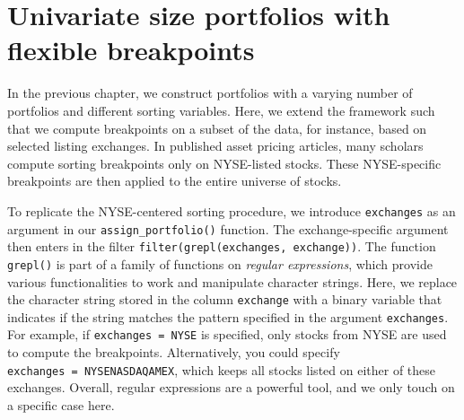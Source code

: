 \documentclass[
]{krantz}
\begin{document}
\hypertarget{univariate-size-portfolios-with-flexible-breakpoints}{%
\section{Univariate size portfolios with flexible breakpoints}\label{univariate-size-portfolios-with-flexible-breakpoints}}

In the previous chapter, we construct portfolios with a varying number of portfolios and different sorting variables. Here, we extend the framework such that we compute breakpoints on a subset of the data, for instance, based on selected listing exchanges. In published asset pricing articles, many scholars compute sorting breakpoints only on NYSE-listed stocks. These NYSE-specific breakpoints are then applied to the entire universe of stocks.

To replicate the NYSE-centered sorting procedure, we introduce \texttt{exchanges} as an argument in our \texttt{assign\_portfolio()} function. The exchange-specific argument then enters in the filter \texttt{filter(grepl(exchanges,\ exchange))}. The function \texttt{grepl()} is part of a family of functions on \emph{regular expressions}, which provide various functionalities to work and manipulate character strings. Here, we replace the character string stored in the column \texttt{exchange} with a binary variable that indicates if the string matches the pattern specified in the argument \texttt{exchanges}. For example, if \texttt{exchanges\ =\ \textquotesingle{}NYSE\textquotesingle{}} is specified, only stocks from NYSE are used to compute the breakpoints. Alternatively, you could specify \texttt{exchanges\ =\ \textquotesingle{}NYSE\textbar{}NASDAQ\textbar{}AMEX\textquotesingle{}}, which keeps all stocks listed on either of these exchanges. Overall, regular expressions are a powerful tool, and we only touch on a specific case here.
\end{document}
